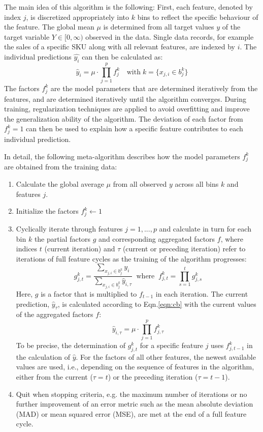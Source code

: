 \documentclass[BCOR=1mm, DIV=calc,10pt,
twoside=true,
twocolumn,
headings=normal]{scrartcl}
\newcommand{\eqn}{Eqn.}
\begin{document}
The main idea of this algorithm is the following: First, each feature, denoted by index $j$, is discretized appropriately into $k$ bins to reflect the specific behaviour of the feature. The global mean $\mu$ is determined from all target values $y$ of the  target variable $Y \in [0,\infty)$ observed in the data. Single data records, for example the sales of a specific SKU along with all relevant features, are indexed by $i$.
The individual predictions $\hat{y_i}$  can then be calculated as:
\begin{equation} \label{eqn:cb}
\hat{y}_i = \mu \cdot \prod \limits_{j=1}^p f^k_j \quad \text{with}\; k=\{ x_{j,i} \in b^k_j\}
\end{equation}
The factors $f^k_j$ are the model parameters that are determined iteratively from the features, and are determined iteratively until the algorithm converges. During training,  regularization techniques are applied to avoid overfitting and improve the generalization ability of the algorithm. The deviation of each factor from $f^k_j=1$ can then be used to explain how a  specific feature contributes to each individual prediction.

In detail, the following meta-algorithm describes how the model parameters $f^k_j$ are obtained from the training data:
\begin{enumerate}
\item{Calculate the global average $\mu$ from all observed $y$ across all bins $k$ and features $j$.}
\item{Initialize the factors $f^k_j \leftarrow 1$}
\item{Cyclically iterate through features $j = 1,...,p $ and calculate in turn for each bin $k$ the partial factors $g$ and corresponding aggregated factors $f$, where indices $t$ (current iteration) and $\tau$ (current or preceding iteration) refer to iterations of full feature cycles as the training of the algorithm progresses:
\begin{equation} \label{factors}
g^k_{j,t} = \frac{\sum \limits_{x_{j,i} \in b^k_j} y_i}{\sum \limits_{x_{j,i} \in b^k_j} \hat{y}_{i,\tau}}\;\; \mathrm{where} \; \; f^k_{j,t} = \prod \limits_{s=1}^t g^k_{j,s}
\end{equation}
Here,  $g$ is a factor that is multiplied to $f_{t-1}$ in each iteration. The current prediction, $\hat{y}_\tau$, is calculated according to \eqn \eqref{eqn:cb} with the current values of the aggregated factors $f$:
\begin{equation} \label{factors3}
\hat{y}_{i,\tau} = \mu \cdot \prod \limits_{j=1}^p f^k_{j,\tau}
\end{equation}
To be precise, the determination of $g^k_{j,t}$ for a specific feature $j$ uses $f^k_{j,t-1}$ in the calculation of $\hat{y}$. For the factors of all other features, the newest available values are used, i.e., depending on the sequence of features in the algorithm, either from the current ($\tau=t$) or the preceding iteration ($\tau=t-1$).}
\item{Quit when stopping criteria, e.g. the maximum number of iterations or no further improvement of an error metric such as the mean absolute deviation (MAD) or mean squared error (MSE), are met at the end of a full feature cycle.}
\end{enumerate}
\end{document}
